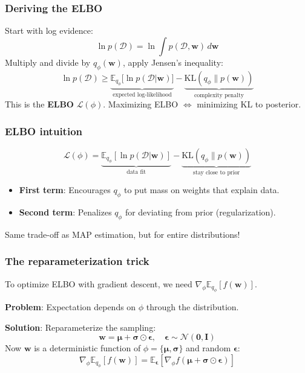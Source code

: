 \documentclass{beamer}
\begin{document}
\begin{frame}
\frametitle{Deriving the ELBO}
Start with log evidence:
\[
\ln p(\mathcal{D}) = \ln \int p(\mathcal{D}, \mathbf{w}) \, d\mathbf{w}
\]
Multiply and divide by $q_\phi(\mathbf{w})$, apply Jensen's inequality:
\[
\ln p(\mathcal{D}) \geq \underbrace{\mathbb{E}_{q_\phi}\bigl[\ln p(\mathcal{D}|\mathbf{w})\bigr]}_{\text{expected log-likelihood}} - \underbrace{\text{KL}(q_\phi \| p(\mathbf{w}))}_{\text{complexity penalty}}
\]
This is the \textbf{ELBO} $\mathcal{L}(\phi)$. Maximizing ELBO $\Leftrightarrow$ minimizing KL to posterior.
\end{frame}

\begin{frame}
\frametitle{ELBO intuition}
\[
\mathcal{L}(\phi) = \underbrace{\mathbb{E}_{q_\phi}[\ln p(\mathcal{D}|\mathbf{w})]}_{\text{data fit}} - \underbrace{\text{KL}(q_\phi \| p(\mathbf{w}))}_{\text{stay close to prior}}
\]
\vspace{0.3cm}
\begin{itemize}
    \item \textbf{First term}: Encourages $q_\phi$ to put mass on weights that explain data.
    \item \textbf{Second term}: Penalizes $q_\phi$ for deviating from prior (regularization).
\end{itemize}
\vspace{0.3cm}
Same trade-off as MAP estimation, but for entire distributions!
\end{frame}

\begin{frame}
\frametitle{The reparameterization trick}
To optimize ELBO with gradient descent, we need $\nabla_\phi \mathbb{E}_{q_\phi}[f(\mathbf{w})]$.
\vspace{0.2cm}

\textbf{Problem}: Expectation depends on $\phi$ through the distribution.
\vspace{0.2cm}

\textbf{Solution}: Reparameterize the sampling:
\[
\mathbf{w} = \boldsymbol{\mu} + \boldsymbol{\sigma} \odot \boldsymbol{\epsilon}, \quad \boldsymbol{\epsilon} \sim \mathcal{N}(\mathbf{0}, \mathbf{I})
\]
Now $\mathbf{w}$ is a deterministic function of $\phi = \{\boldsymbol{\mu}, \boldsymbol{\sigma}\}$ and random $\boldsymbol{\epsilon}$:
\[
\nabla_\phi \mathbb{E}_{q_\phi}[f(\mathbf{w})] = \mathbb{E}_{\boldsymbol{\epsilon}}[\nabla_\phi f(\boldsymbol{\mu} + \boldsymbol{\sigma} \odot \boldsymbol{\epsilon})]
\]
\end{frame}
\end{document}
